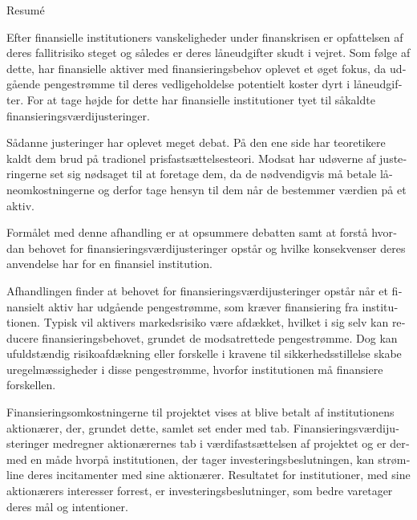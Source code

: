 \documentclass[main.tex]{subfiles}
\begin{document}
    \begin{otherlanguage}{danish}
    \thispagestyle{empty}
    \begin{adjustwidth}{0cm}{0cm}
    \begin{center}
    {\LARGE Resumé}
    \end{center}

    Efter finansielle institutioners vanskeligheder under finanskrisen 
    er opfattelsen af deres fallitrisiko steget og således er deres låneudgifter skudt i vejret.
    Som følge af dette, har finansielle aktiver med finansieringsbehov oplevet et øget fokus, 
    da udgående pengestrømme til deres vedligeholdelse potentielt koster dyrt i låneudgifter.
    For at tage højde for dette
    har finansielle institutioner tyet til såkaldte finansieringsværdijusteringer.

    Sådanne justeringer har oplevet meget debat. 
    På den ene side har teoretikere kaldt dem brud på tradionel prisfastsættelsesteori.
    Modsat har udøverne af justeringerne set sig nødsaget til at foretage dem,
    da de nødvendigvis må betale låneomkostningerne 
    og derfor tage hensyn til dem når de bestemmer værdien på et aktiv. 

    Formålet med denne afhandling er at opsummere debatten
    samt at forstå hvordan behovet for finansieringsværdijusteringer opstår 
    og hvilke konsekvenser deres anvendelse har for en finansiel institution. 

    Afhandlingen finder at behovet for finansieringsværdijusteringer opstår 
    når et finansielt aktiv har udgående pengestrømme, som kræver finansiering fra institutionen.
    Typisk vil aktivers markedsrisiko være afdækket,
    hvilket i sig selv kan reducere finansieringsbehovet, grundet de modsatrettede pengestrømme.
    Dog kan ufuldstændig risikoafdækning eller forskelle i kravene til sikkerhedsstillelse
    skabe uregelmæssigheder i disse pengestrømme, hvorfor institutionen må finansiere forskellen.
    
    Finansieringsomkostningerne til projektet vises at blive betalt af institutionens aktionærer,
    der, grundet dette, samlet set ender med tab.
    Finansieringsværdijusteringer medregner aktionærernes tab i værdifastsættelsen af projektet
    og er dermed en måde hvorpå institutionen, der tager investeringsbeslutningen, 
    kan strømline deres incitamenter med sine aktionærer. 
    Resultatet for institutioner, med sine aktionærers interesser forrest,
    er investeringsbeslutninger, som bedre varetager deres mål og intentioner.
    
    \end{adjustwidth}
    \end{otherlanguage}
\end{document}
